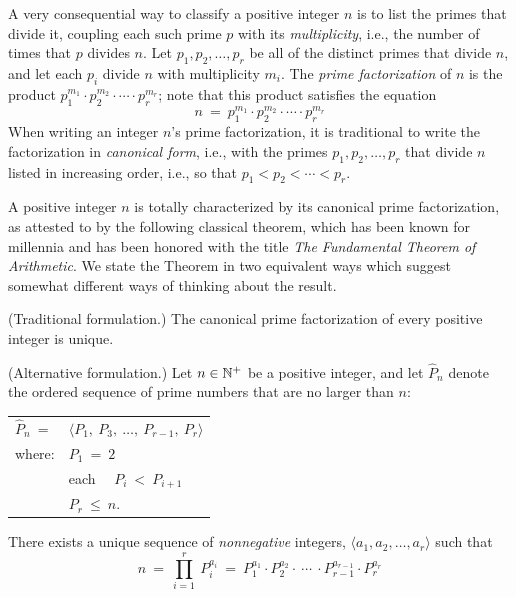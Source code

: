 A very consequential way to classify a positive integer $n$ is to list
the primes that divide it, coupling each such prime $p$ with its {\it
  multiplicity}, i.e., the number of times that $p$ divides $n$.  Let
$p_1, p_2, \ldots, p_r$ be all of the distinct primes that divide $n$,
and let each $p_i$ divide $n$ with multiplicity $m_i$.  The {\it prime
  factorization}   
of $n$ is the product $p_1^{m_1} \cdot p_2^{m_2} \cdot \cdots \cdot
p_r^{m_r}$; note that this product satisfies the equation
\begin{equation}
\label{eq:prime-factorization}
n \ = \ p_1^{m_1} \cdot p_2^{m_2} \cdot \cdots \cdot p_r^{m_r}
\end{equation}
When writing an integer $n$'s prime factorization, it is traditional
to write the factorization in {\it canonical form},
i.e., with the primes $p_1, p_2, \ldots, p_r$ that divide $n$ listed
in increasing order, i.e., so that $p_1 < p_2 < \cdots < p_r$.

A positive integer $n$ is totally characterized by its canonical prime
factorization, as attested to by the following classical theorem,
which has been known for millennia and has been honored with the title
{\em The Fundamental Theorem of Arithmetic}.
We state the Theorem in two equivalent ways which suggest somewhat
different ways of thinking about the result.

\begin{theorem}
\label{thm:Fund-Thm-Arith}

\noindent
{\rm (Traditional formulation.)}
%
The canonical prime factorization of every positive integer is unique.

\noindent
{\rm (Alternative formulation.)}
%
Let $n \in \mathbb{N}^+$ be a positive integer, and let $\widehat{P}_n$ denote the
ordered sequence of prime numbers that are no larger than $n$:

\begin{tabular}{ll}
$\widehat{P}_n \ =$  & $\langle P_1, \ P_3, \ \ldots, \ P_{r-1}, \ P_r \rangle$ \\
where:               & $P_1 \ = \ 2$ \\
                     & each  \ \ $P_i \ < \ P_{i+1}$ \\
                     & $P_r \ \leq \ n$.
\end{tabular}

\noindent
There exists a unique sequence of {\em nonnegative} integers, 
$\langle a_1, a_2, \ldots, a_r \rangle$
such that
\[
n \ = \ \prod_{i=1}^r \ P_i^{a_i} \ = \
P_1^{a_1} \cdot P_2^{a_2} \cdot \ \cdots \ \cdot P_{r-1}^{a_{r-1}} \cdot P_r^{a_r}
\]
\end{theorem}

